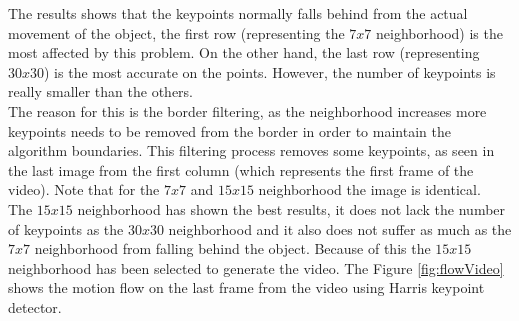 \documentclass[12pt,a4paper]{article}
\begin{document}
The results shows that the keypoints normally falls behind from the actual movement of the object, the first row (representing the $7x7$ neighborhood) is the most affected by this problem. On the other hand, the last row (representing $30x30$) is the most accurate on the points. However, the number of keypoints is really smaller than the others. \\

The reason for this is the border filtering, as the neighborhood increases more keypoints needs to be removed from the border in order to maintain the algorithm boundaries. This filtering process removes some keypoints, as seen in the last image from the first column (which represents the first frame of the video). Note that for the $7x7$ and $15x15$ neighborhood the image is identical. \\

The $15x15$ neighborhood has shown the best results, it does not lack the number of keypoints as the $30x30$ neighborhood and it also does not suffer as much as the $7x7$ neighborhood from falling behind the object. Because of this the $15x15$ neighborhood has been selected to generate the video. The Figure \ref{fig:flowVideo} shows the motion flow on the last frame from the video using Harris keypoint detector. \\
\end{document}
